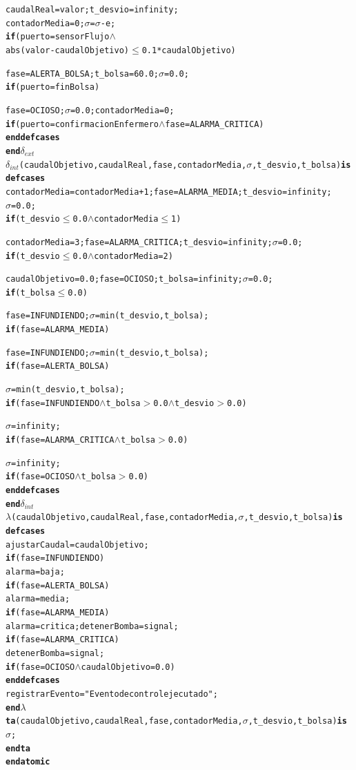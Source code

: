 \documentclass[12pt, a4paper]{article}
\newcommand{\cmlgt}{$>$}
\newcommand{\cmlle}{$\leq$}
\newcommand{\cmlwedge}{$\wedge$}
\newcommand{\kw}[1]{\textbf{#1}}          %
\newcommand{\cmlsigma}{$\sigma$}
\newcommand{\dint}{$\delta_{\mathit{int}}$}
\newcommand{\dext}{$\delta_{\mathit{ext}}$}
\newcommand{\clambda}{$\lambda$}
\newcommand{\cmlta}{\textbf{ta}}
\newenvironment{cmldevs}{%
  \begin{alltt}\small%
}{%
  \end{alltt}%
}
\begin{document}
\begin{center}
\begin{cmldevs}
        caudalReal = valor; t\_desvio = infinity; 
        contadorMedia = 0; \cmlsigma{} = \cmlsigma{} - e;
            \kw{if} (puerto = sensorFlujo \cmlwedge{} 
                abs(valor - caudalObjetivo) \cmlle{} 0.1 * caudalObjetivo)
            
        fase = ALERTA\_BOLSA; t\_bolsa = 60.0; \cmlsigma{} = 0.0;
            \kw{if} (puerto = finBolsa)
            
        fase = OCIOSO; \cmlsigma{} = 0.0; contadorMedia = 0;
            \kw{if} (puerto = confirmacionEnfermero \cmlwedge{} fase = ALARMA\_CRITICA)
    \kw{end defcases}
\kw{end} \dext{}
\dint{}(caudalObjetivo, caudalReal, fase, contadorMedia, \cmlsigma{}, t\_desvio, t\_bolsa) \kw{is}
    \kw{defcases}
        contadorMedia = contadorMedia + 1; fase = ALARMA\_MEDIA; t\_desvio = infinity; 
        \cmlsigma{} = 0.0;
            \kw{if} (t\_desvio \cmlle{} 0.0 \cmlwedge{} contadorMedia \cmlle{} 1)
            
        contadorMedia = 3; fase = ALARMA\_CRITICA; t\_desvio = infinity; \cmlsigma{} = 0.0;
            \kw{if} (t\_desvio \cmlle{} 0.0 \cmlwedge{} contadorMedia = 2)
            
        caudalObjetivo = 0.0; fase = OCIOSO; t\_bolsa = infinity; \cmlsigma{} = 0.0; 
            \kw{if} (t\_bolsa \cmlle{} 0.0)

        fase = INFUNDIENDO; \cmlsigma{} = min(t\_desvio, t\_bolsa);
            \kw{if} (fase = ALARMA\_MEDIA)
            
        fase = INFUNDIENDO; \cmlsigma{} = min(t\_desvio, t\_bolsa);
            \kw{if} (fase = ALERTA\_BOLSA)
            
        \cmlsigma{} = min(t\_desvio, t\_bolsa);
            \kw{if} (fase = INFUNDIENDO \cmlwedge{} t\_bolsa \cmlgt{} 0.0 \cmlwedge{} t\_desvio \cmlgt{} 0.0)
            
        \cmlsigma{} = infinity;
            \kw{if} (fase = ALARMA\_CRITICA \cmlwedge{} t\_bolsa \cmlgt{} 0.0)
            
        \cmlsigma{} = infinity;
            \kw{if} (fase = OCIOSO \cmlwedge{} t\_bolsa \cmlgt{} 0.0)
    \kw{end defcases}
\kw{end} \dint{}
\clambda{}(caudalObjetivo, caudalReal, fase, contadorMedia, \cmlsigma{}, t\_desvio, t\_bolsa) \kw{is}
    \kw{defcases}
        ajustarCaudal = caudalObjetivo;
            \kw{if} (fase = INFUNDIENDO)
        alarma = baja;
            \kw{if} (fase = ALERTA\_BOLSA)
        alarma = media;
            \kw{if} (fase = ALARMA\_MEDIA)
        alarma = critica; detenerBomba = signal;
            \kw{if} (fase = ALARMA\_CRITICA)
        detenerBomba = signal;
            \kw{if} (fase = OCIOSO \cmlwedge{} caudalObjetivo = 0.0)
    \kw{end defcases}
    registrarEvento = "Evento de control ejecutado";
\kw{end} \clambda{}
\cmlta{}(caudalObjetivo, caudalReal, fase, contadorMedia, \cmlsigma{}, t\_desvio, t\_bolsa) \kw{is}
    \cmlsigma{};
\kw{end} \cmlta{}
\kw{end atomic}
\end{cmldevs}
\label{fig:controlador-bomba}
\end{center}
\end{document}
